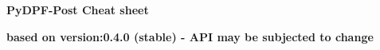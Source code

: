 \documentclass[9pt,landscape]{article}
\begin{document}
\raggedright
\footnotesize


\begin{center}
     \Huge{\textbf{PyDPF-Post Cheat sheet}} \\
\end{center}
\begin{center}
\small{\textbf{based on version:0.4.0 (stable) - API may be subjected to change}} \
\end{center}
\vspace{-0.15cm}
\noindent\makebox[\linewidth]{\rule{\paperwidth}{2pt}}
\end{document}
